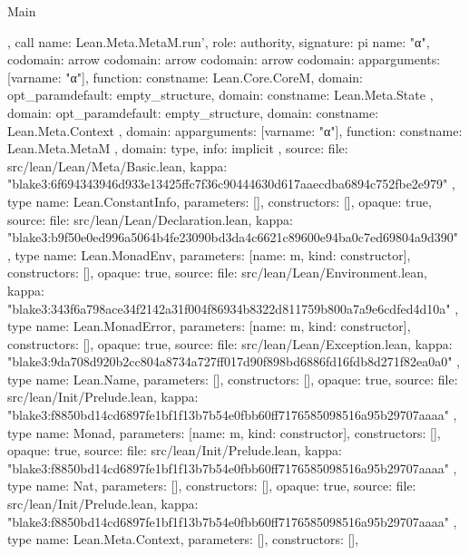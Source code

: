 \begin{lexlean}{Main}
\begin{toolingmodule}
{{{      }
    },
    call{
      name: Lean.Meta.MetaM.run',
      role: authority,
      signature: pi{
        name: "α",
        codomain: arrow{
          codomain: arrow{
            codomain: arrow{
              codomain: app{arguments: [var{name: "α"}], function: const{name: Lean.Core.CoreM}},
              domain: opt_param{default: empty_structure{}, domain: const{name: Lean.Meta.State}}
            },
            domain: opt_param{default: empty_structure{}, domain: const{name: Lean.Meta.Context}}
          },
          domain: app{arguments: [var{name: "α"}], function: const{name: Lean.Meta.MetaM}}
        },
        domain: type{},
        info: implicit
      },
      source: {
        file: src/lean/Lean/Meta/Basic.lean,
        kappa: "blake3:6f694343946d933e13425ffc7f36c90444630d617aaecdba6894c752fbe2e979"
      }
    },
    type{
      name: Lean.ConstantInfo,
      parameters: [],
      constructors: [],
      opaque: true,
      source: {
        file: src/lean/Lean/Declaration.lean,
        kappa: "blake3:b9f50e0ed996a5064b4fe23090bd3da4c6621c89600e94ba0c7ed69804a9d390"
      }
    },
    type{
      name: Lean.MonadEnv,
      parameters: [{name: m, kind: constructor{}}],
      constructors: [],
      opaque: true,
      source: {
        file: src/lean/Lean/Environment.lean,
        kappa: "blake3:343f6a798ace34f2142a31f004f86934b8322d811759b800a7a9e6cdfed4d10a"
      }
    },
    type{
      name: Lean.MonadError,
      parameters: [{name: m, kind: constructor{}}],
      constructors: [],
      opaque: true,
      source: {
        file: src/lean/Lean/Exception.lean,
        kappa: "blake3:9da708d920b2cc804a8734a727ff017d90f898bd6886fd16fdb8d271f82ea0a0"
      }
    },
    type{
      name: Lean.Name,
      parameters: [],
      constructors: [],
      opaque: true,
      source: {
        file: src/lean/Init/Prelude.lean,
        kappa: "blake3:f8850bd14cd6897fe1bf1f13b7b54e0fbb60ff7176585098516a95b29707aaaa"
      }
    },
    type{
      name: Monad,
      parameters: [{name: m, kind: constructor{}}],
      constructors: [],
      opaque: true,
      source: {
        file: src/lean/Init/Prelude.lean,
        kappa: "blake3:f8850bd14cd6897fe1bf1f13b7b54e0fbb60ff7176585098516a95b29707aaaa"
      }
    },
    type{
      name: Nat,
      parameters: [],
      constructors: [],
      opaque: true,
      source: {
        file: src/lean/Init/Prelude.lean,
        kappa: "blake3:f8850bd14cd6897fe1bf1f13b7b54e0fbb60ff7176585098516a95b29707aaaa"
      }
    },
    type{
      name: Lean.Meta.Context,
      parameters: [],
      constructors: [],
}}
\end{toolingmodule}
\end{lexlean}
